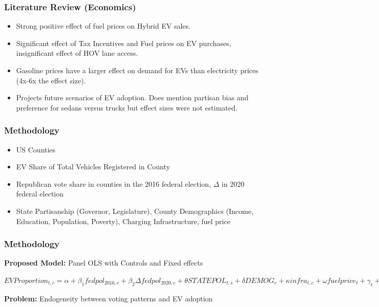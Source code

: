 \documentclass{beamer}
\begin{document}
\begin{frame}
\frametitle{Literature Review (Economics)}

\begin{itemize}
    \item {} Strong positive effect of fuel prices on Hybrid EV sales.
    \item {} Significant effect of Tax Incentives and Fuel prices on EV purchases, insignificant effect of HOV lane access.
    \item {} Gasoline prices have a larger effect on demand for EVs than electricity prices (4x-6x the effect size).
    \item {} Projects future scenarios of EV adoption. Does mention partisan bias and preference for sedans versus trucks but effect sizes were not estimated.
\end{itemize}
\end{frame}

\begin{frame}
\frametitle{Methodology}
\begin{itemize}
    \item {} US Counties 
    \item {} EV Share of Total Vehicles Registered in County
    \item {} Republican vote share in counties in the 2016 federal election, $\Delta$ in 2020 federal election
    \item {} State Partisanship (Governor, Legislature), County Demographics (Income, Education, Population, Poverty), Charging Infrastructure, fuel price
\end{itemize}
\end{frame}

\begin{frame}
\frametitle{Methodology}

\textbf{Proposed Model:} Panel OLS with Controls and Fixed effects

\vspace{5mm}

\centering
$
{EV Proportion_{t,c}} = \alpha + \beta_{1} fed pol_{2016,c} + \beta_{2} \Delta fed pol_{2020,c} +\theta STATE POL_{t,s} +\delta  DEMOG_{c} + \kappa  infra_{t,c} + \omega fuelprice_{t} + \gamma_{t} + \tau_{s} +\epsilon
$

\vspace{5mm}

\raggedright

\textbf{Problem:} Endogeneity between voting patterns and EV adoption

\end{frame}
\end{document}
